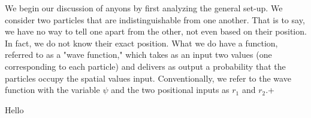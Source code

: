\documentclass[10pt]{ucthesis}
\begin{document}
We begin our discussion of anyons by first analyzing the general set-up. We consider two particles that are indistinguishable from one another. That is to say, we have no way to tell one apart from the other, not even based on their position. In fact, we do not know their exact position. What we do have a function, referred to as a "wave function," which takes as an input two values (one corresponding to each particle) and delivers as output a probability that the particles occupy the spatial values input. Conventionally, we refer to the wave function with the variable $\psi$ and the two positional inputs as $r_1$ and $r_2$.+





\newpage
Hello














\clearpage

%
%

\begin{thebibliography}{9}











\end{thebibliography}
\end{document}
